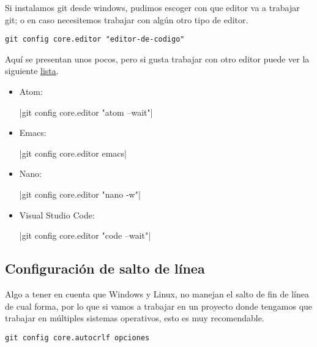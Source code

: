 Si instalamos git desde windows, pudimos escoger con que editor va a trabajar git; o en caso necesitemos trabajar con algún otro tipo de editor.

\begin{gitCode}
\begin{verbatim}
git config core.editor "editor-de-codigo"
\end{verbatim}
\end{gitCode}

Aquí se presentan unos pocos, pero si gusta trabajar con otro editor puede ver la siguiente
\href{https://git-scm.com/book/en/v2/Appendix-C\%3A-Git-Commands-Setup-and-Config}{lista}.

\begin{itemize}

	\item Atom:
	\begin{terminal}
		|git config core.editor "atom --wait"|
	\end{terminal}

	\item Emacs:
	\begin{terminal}
		|git config core.editor emacs|
	\end{terminal}

	\item Nano:
	\begin{terminal}
		|git config core.editor "nano -w"|
	\end{terminal}
	
	\item Visual Studio Code:
	\begin{terminal}
		|git config core.editor "code --wait"|
	\end{terminal}	

\end{itemize}

\subsection{Configuración de salto de línea}

Algo a tener en cuenta que Windows y Linux, no manejan el salto de fin de línea de cual forma, por lo que si vamos a trabajar en un proyecto donde tengamos que
trabajar en múltiples sistemas operativos, esto es muy recomendable.

\begin{gitCode}
\begin{verbatim}
git config core.autocrlf opciones
\end{verbatim}
\end{gitCode}

